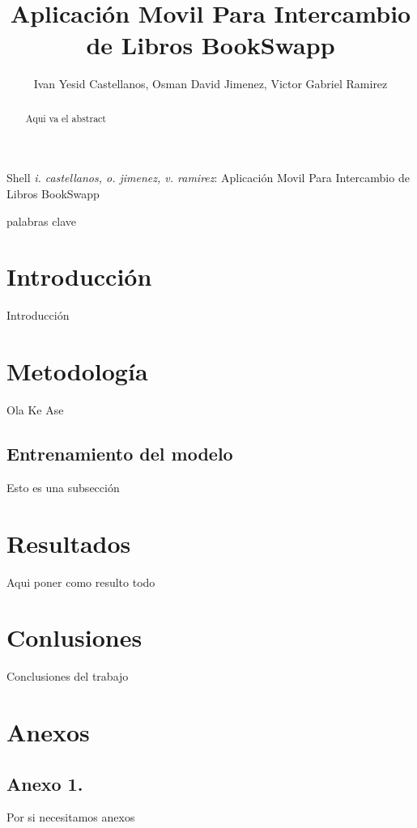 \documentclass[]{IEEEtran}
\begin{document}
\title{Aplicación Movil Para Intercambio de Libros BookSwapp}
\author{Ivan Yesid Castellanos, Osman David Jimenez, Victor Gabriel Ramirez}

{Shell \MakeLowercase{\textit{I. Castellanos, O. Jimenez, V. Ramirez}}: Aplicación Movil Para Intercambio de Libros BookSwapp}

\maketitle

\begin{abstract}
Aqui va el abstract
\end{abstract}

\begin{IEEEkeywords}
	palabras clave
\end{IEEEkeywords}

\IEEEpeerreviewmaketitle

\section{Introducción}

Introducción

\section{Metodología}

Ola Ke Ase 

\subsection{Entrenamiento del modelo}

Esto es una subsección

\section{Resultados}

Aqui poner como resulto todo

\section{Conlusiones}

Conclusiones del trabajo





\newpage

\section*{Anexos}

\subsection{Anexo 1. }\label{sec:Anexo1}

Por si necesitamos anexos
\end{document}
